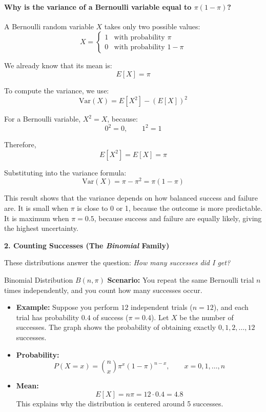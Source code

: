 \paragraph*{Why is the variance of a Bernoulli variable equal to \(\pi(1-\pi)\)?}
A Bernoulli random variable \(X\) takes only two possible values:
\[
X =
\begin{cases}
1 & \text{with probability } \pi \\
0 & \text{with probability } 1-\pi
\end{cases}
\]

We already know that its mean is:
\[
E[X]=\pi
\]

To compute the variance, we use:
\[
\mathrm{Var}(X)=E[X^2]-(E[X])^2
\]

For a Bernoulli variable, \(X^2=X\), because:
\[
0^2=0, \qquad 1^2=1
\]

Therefore,
\[
E[X^2]=E[X]=\pi
\]

Substituting into the variance formula:
\[
\mathrm{Var}(X)=\pi-\pi^2=\pi(1-\pi)
\]

This result shows that the variance depends on how balanced success and failure are. It is small when \(\pi\) is close to 0 or 1, because the outcome is more predictable. It is maximum when \(\pi=0.5\), because success and failure are equally likely, giving the highest uncertainty.


\vspace{0.25cm}
\textbf{2. Counting Successes (The \textit{Binomial} Family)}

These distributions answer the question: \textit{How many successes did I get?}

\vs

\begin{defbox}{Binomial Distribution $B(n, \pi)$}
\textbf{Scenario:} You repeat the same Bernoulli trial \(n\) times independently, and you count how many successes occur.

\begin{itemize}
    \item \textbf{Example:} Suppose you perform \(12\) independent trials (\(n=12\)), and each trial has probability \(0.4\) of success (\(\pi=0.4\)). Let \(X\) be the number of successes. The graph shows the probability of obtaining exactly \(0,1,2,\dots,12\) successes.

\vs

    \item \textbf{Probability:}
    \begin{equation}
    P(X=x)=\binom{n}{x}\pi^x(1-\pi)^{n-x}, \qquad x=0,1,\dots,n
    \end{equation}
    \item \textbf{Mean:}
    \begin{equation}
    E[X]=n\pi=12 \cdot 0.4=4.8
   \end{equation}
    This explains why the distribution is centered around 5 successes.
\end{itemize}
\end{defbox}

